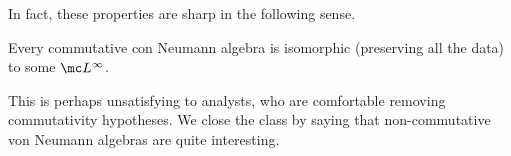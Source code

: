 \documentclass[../notes.tex]{subfiles}
\begin{document}
In fact, these properties are sharp in the following sense.
\begin{theorem}
	Every commutative con Neumann algebra is isomorphic (preserving all the data) to some $\mc L^\infty$.
\end{theorem}
This is perhaps unsatisfying to analysts, who are comfortable removing commutativity hypotheses. We close the class by saying that non-commutative von Neumann algebras are quite interesting.
\end{document}
